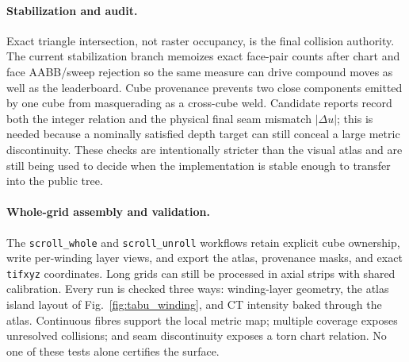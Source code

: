 \paragraph{Stabilization and audit.} Exact triangle intersection, not raster occupancy, is the final collision authority. The current stabilization branch memoizes exact face-pair counts after chart and face AABB/sweep rejection so the same measure can drive compound moves as well as the leaderboard. Cube provenance prevents two close components emitted by one cube from masquerading as a cross-cube weld. Candidate reports record both the integer relation and the physical final seam mismatch $|\Delta u|$; this is needed because a nominally satisfied depth target can still conceal a large metric discontinuity. These checks are intentionally stricter than the visual atlas and are still being used to decide when the implementation is stable enough to transfer into the public tree.

\paragraph{Whole-grid assembly and validation.} The \texttt{scroll\_whole} and \texttt{scroll\_unroll} workflows retain explicit cube ownership, write per-winding layer views, and export the atlas, provenance masks, and exact \texttt{tifxyz} coordinates. Long grids can still be processed in axial strips with shared calibration. Every run is checked three ways: winding-layer geometry, the atlas island layout of Fig.~\ref{fig:tabu_winding}, and CT intensity baked through the atlas. Continuous fibres support the local metric map; multiple coverage exposes unresolved collisions; and seam discontinuity exposes a torn chart relation. No one of these tests alone certifies the surface.

